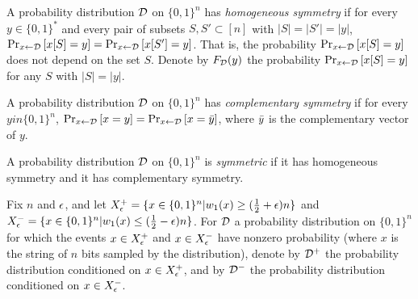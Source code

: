 \begin{definition}
A probability distribution $\mathcal{D}$ on $\{0, 1\}^n$ has \emph{homogeneous
symmetry} if for every $y \in \{0, 1\}^*$ and every pair of subsets $S, S' \subset [n]$
with $|S| = |S'| = |y|$, 
$\text{Pr}_{x \leftarrow \mathcal{D}}\left[x[S] = y\right] = \text{Pr}_{x \leftarrow \mathcal{D}}\left[x[S'] = y\right]$.
That is, the probability $\text{Pr}_{x \leftarrow \mathcal{D}}\left[x[S] = y\right]$ does not depend
on the set $S$. Denote by $F_{\mathcal{D}}(y)$ the probability
$\text{Pr}_{x \leftarrow \mathcal{D}}\left[x[S] = y\right]$ for any $S$ with $|S| = |y|$.

A probability distribution $\mathcal{D}$ on $\{0, 1\}^n$ has \emph{complementary symmetry} if for every
$y in \{0, 1\}^n$, $\text{Pr}_{x \leftarrow \mathcal{D}}\left[x = y\right] = \text{Pr}_{x \leftarrow \mathcal{D}}\left[x = \bar{y}\right]$,
where $\bar{y}$ is the complementary vector of $y$.

A probability distribution $\mathcal{D}$ on $\{0, 1\}^n$ is \emph{symmetric} if it has homogeneous symmetry
and it has complementary symmetry. 
\end{definition}

Fix $n$ and $\epsilon$, and let $X^+_\epsilon = \{x \in \{0, 1\}^n | w_1(x) \geq (\frac{1}{2}+\epsilon )n \}$
and $X^-_\epsilon = \{x \in \{0, 1\}^n | w_1(x) \leq (\frac{1}{2}-\epsilon )n \}$.
For $\mathcal{D}$ a probability distribution on $\{0, 1\}^n$ for which
the events $x \in X^+_\epsilon$ and $x \in X^-_\epsilon$ have nonzero probability (where $x$
is the string of $n$ bits sampled by the distribution), 
denote by $\mathcal{D}^+$ the probability distribution conditioned on $x \in X^+_\epsilon$,
and by $\mathcal{D}^-$ the probability distribution conditioned on $x \in X^-_\epsilon$.

